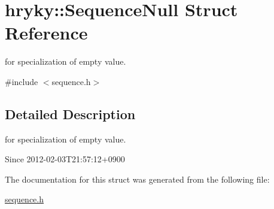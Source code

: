 \hypertarget{structhryky_1_1_sequence_null}{\section{hryky\-:\-:Sequence\-Null Struct Reference}
\label{structhryky_1_1_sequence_null}
}


for specialization of empty value.  




{\ttfamily \#include $<$sequence.\-h$>$}



\subsection{Detailed Description}
for specialization of empty value. 

\begin{DoxySince}{Since}
2012-\/02-\/03\-T21\-:57\-:12+0900 
\end{DoxySince}


The documentation for this struct was generated from the following file\-:\begin{DoxyCompactItemize}
\item 
\hyperlink{sequence_8h}{sequence.\-h}\end{DoxyCompactItemize}
